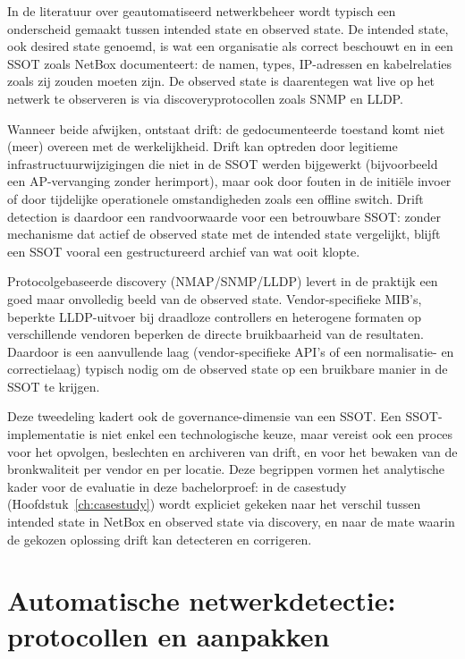 In de literatuur over geautomatiseerd netwerkbeheer wordt typisch een onderscheid gemaakt tussen intended state en observed state\autocite{Campbell2007,AutomaticTopology2013}. De intended state, ook desired state genoemd, is wat een organisatie als correct beschouwt en in een SSOT zoals NetBox documenteert: de namen, types, IP-adressen en kabelrelaties zoals zij zouden moeten zijn. De observed state is daarentegen wat live op het netwerk te observeren is via discoveryprotocollen zoals SNMP en LLDP\autocite{SnmpTopologyDiscoveryIEEE2013,LLDP_IJCA}.

Wanneer beide afwijken, ontstaat drift: de gedocumenteerde toestand komt niet (meer) overeen met de werkelijkheid. Drift kan optreden door legitieme infrastructuurwijzigingen die niet in de SSOT werden bijgewerkt (bijvoorbeeld een AP-vervanging zonder herimport), maar ook door fouten in de initiële invoer of door tijdelijke operationele omstandigheden zoals een offline switch. Drift detection is daardoor een randvoorwaarde voor een betrouwbare SSOT: zonder mechanisme dat actief de observed state met de intended state vergelijkt, blijft een SSOT vooral een gestructureerd archief van wat ooit klopte\autocite{Campbell2007,AutomaticTopology2013}.

Protocolgebaseerde discovery (NMAP/SNMP/LLDP) levert in de praktijk een goed maar onvolledig beeld van de observed state. Vendor-specifieke MIB's, beperkte LLDP-uitvoer bij draadloze controllers en heterogene formaten op verschillende vendoren beperken de directe bruikbaarheid van de resultaten\autocite{SnmpTopologyDiscoveryIEEE2013,LLDP_IJCA,WirelessTopology2015}. Daardoor is een aanvullende laag (vendor-specifieke API's of een normalisatie- en correctielaag) typisch nodig om de observed state op een bruikbare manier in de SSOT te krijgen.

Deze tweedeling kadert ook de governance-dimensie van een SSOT. Een SSOT-implementatie is niet enkel een technologische keuze, maar vereist ook een proces voor het opvolgen, beslechten en archiveren van drift, en voor het bewaken van de bronkwaliteit per vendor en per locatie\autocite{Campbell2007}. Deze begrippen vormen het analytische kader voor de evaluatie in deze bachelorproef: in de casestudy (Hoofdstuk~\ref{ch:casestudy}) wordt expliciet gekeken naar het verschil tussen intended state in NetBox en observed state via discovery, en naar de mate waarin de gekozen oplossing drift kan detecteren en corrigeren.

\section{Automatische netwerkdetectie: protocollen en aanpakken}

